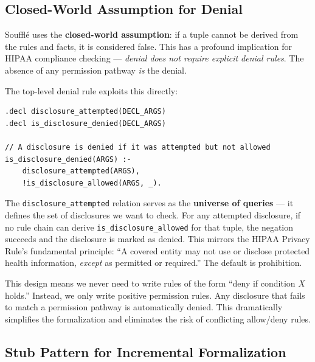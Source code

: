 \documentclass[11pt,letterpaper]{article}
\begin{document}
\subsection{Closed-World Assumption for Denial}
\label{sec:closed-world}

Souffl\'{e} uses the \textbf{closed-world assumption}: if a tuple cannot be derived from the rules and facts, it is considered false. This has a profound implication for HIPAA compliance checking --- \emph{denial does not require explicit denial rules}. The absence of any permission pathway \emph{is} the denial.

The top-level denial rule exploits this directly:

\begin{lstlisting}[style=soufflestyle,caption={Denial via closed-world assumption (from hipaa\_top.dl)}]
.decl disclosure_attempted(DECL_ARGS)
.decl is_disclosure_denied(DECL_ARGS)

// A disclosure is denied if it was attempted but not allowed
is_disclosure_denied(ARGS) :-
    disclosure_attempted(ARGS),
    !is_disclosure_allowed(ARGS, _).
\end{lstlisting}

The \texttt{disclosure\_attempted} relation serves as the \textbf{universe of queries} --- it defines the set of disclosures we want to check. For any attempted disclosure, if no rule chain can derive \texttt{is\_disclosure\_allowed} for that tuple, the negation succeeds and the disclosure is marked as denied. This mirrors the HIPAA Privacy Rule's fundamental principle: ``A covered entity may not use or disclose protected health information, \emph{except} as permitted or required.'' The default is prohibition.

\begin{designbox}
This design means we never need to write rules of the form ``deny if condition $X$ holds.'' Instead, we only write positive permission rules. Any disclosure that fails to match a permission pathway is automatically denied. This dramatically simplifies the formalization and eliminates the risk of conflicting allow/deny rules.
\end{designbox}

\subsection{Stub Pattern for Incremental Formalization}
\label{sec:stub-pattern-principles}
\end{document}
